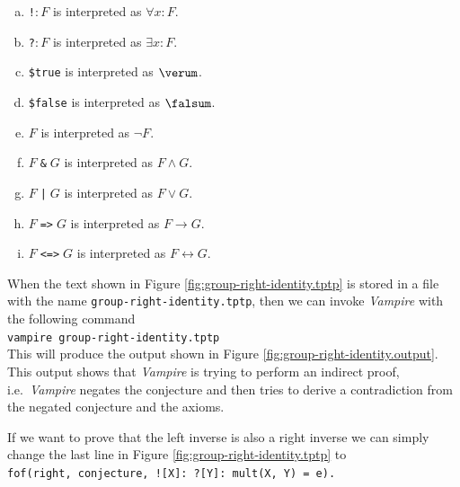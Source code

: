 \begin{enumerate}[(a)]
\item \texttt{!\;[X]}$:F$ is interpreted as $\forall x: F$.
\item \texttt{?\;[X]}$:F$ is interpreted as $\exists x:F$.
\item \texttt{\$true} is interpreted as $\verum$.
\item \texttt{\$false} is interpreted as $\falsum$.
\item \texttt{}$F$ is interpreted as $\neg F$.
\item $F\;$\texttt{\&}$\;G$ is interpreted as $F \wedge G$.
\item $F\;$\texttt{|}$\;G$ is interpreted as $F \vee G$.
\item $F\;$\texttt{=>}$\;G$ is interpreted as $F \rightarrow G$.
\item $F\;$\texttt{<=>}$\;G$ is interpreted as $F \leftrightarrow G$.
\end{enumerate}
When the text shown in Figure \ref{fig:group-right-identity.tptp} is stored in a file with the name \texttt{group-right-identity.tptp},
then we can invoke \textsl{Vampire} with the following command
\\[0.2cm]
\hspace*{1.3cm}
\texttt{vampire group-right-identity.tptp}
\\[0.2cm]
This will produce the output shown in Figure \ref{fig:group-right-identity.output}.  This output shows that
\textsl{Vampire} is trying to perform an indirect proof, i.e.~\textsl{Vampire} negates the conjecture and then
tries to derive a contradiction from the negated conjecture and the axioms.

If we want to prove that the left inverse is also a right inverse we can simply change the last line in Figure
\ref{fig:group-right-identity.tptp} to
\\[0.2cm]
\hspace*{1.3cm}
\texttt{fof(right, conjecture, ![X]: ?[Y]: mult(X, Y) = e).}


